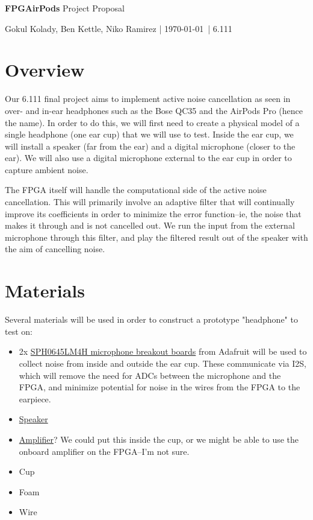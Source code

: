 \documentclass[12pt]{fpgairpods}
\begin{document}
{\Huge \textbf{FPGAirPods} Project Proposal}

\vspace{2mm}
{Gokul Kolady, Ben Kettle, Niko Ramirez | \today \ | 6.111}
\vspace{5mm}


\begin{multicols}{2}
\section{Overview}
Our 6.111 final project aims to implement active noise cancellation as seen in over- and in-ear headphones such as the Bose QC35 and the AirPods Pro (hence the name). In order to do this, we will first need to create a physical model of a single headphone (one ear cup) that we will use to test. Inside the ear cup, we will install a speaker (far from the ear) and a digital microphone (closer to the ear). We will also use a digital microphone external to the ear cup in order to capture ambient noise.

The FPGA itself will handle the computational side of the active noise cancellation. This will primarily involve an adaptive filter that will continually improve its coefficients in order to minimize the error function--ie, the noise that makes it through and is not cancelled out. We run the input from the external microphone through this filter, and play the filtered result out of the speaker with the aim of cancelling noise.

\section{Materials}


Several materials will be used in order to construct a prototype "headphone" to test on: 
\begin{itemize}
    \item 2x \href{https://www.adafruit.com/product/3421}{SPH0645LM4H microphone breakout boards} from Adafruit will be used to collect noise from inside and outside the ear cup. These communicate via I2S, which will remove the need for ADCs between the microphone and the FPGA, and minimize potential for noise in the wires from the FPGA to the earpiece.
    \item \href{https://www.adafruit.com/product/3968}{Speaker}
    \item \href{https://www.adafruit.com/product/3006}{Amplifier}? We could put this inside the cup, or we might be able to use the onboard amplifier on the FPGA--I'm not sure.
    \item Cup
    \item Foam
    \item Wire
\end{itemize}
\end{multicols}
\end{document}
